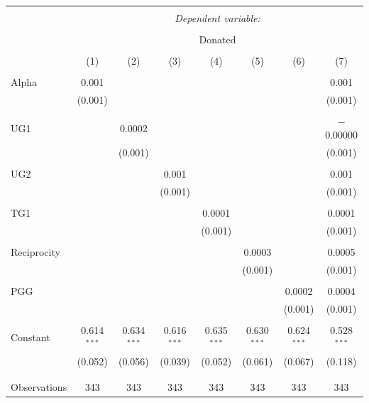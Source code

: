 \documentclass[12pt]{article}
\begin{document}
\begin{table}[!htbp] \centering 
  \caption{} 
  \label{} 
        \begin{adjustbox}{width=\textwidth}
\begin{tabular}{@{\extracolsep{5pt}}lccccccc} 
\\[-1.8ex]\hline 
\hline \\[-1.8ex] 
 & \multicolumn{7}{c}{\textit{Dependent variable:}} \\ 
\cline{2-8} 
\\[-1.8ex] & \multicolumn{7}{c}{Donated} \\ 
\\[-1.8ex] & (1) & (2) & (3) & (4) & (5) & (6) & (7)\\ 
\hline \\[-1.8ex] 
 Alpha & 0.001 &  &  &  &  &  & 0.001 \\ 
  & (0.001) &  &  &  &  &  & (0.001) \\ 
  & & & & & & & \\ 
 UG1 &  & 0.0002 &  &  &  &  & $-$0.00000 \\ 
  &  & (0.001) &  &  &  &  & (0.001) \\ 
  & & & & & & & \\ 
 UG2 &  &  & 0.001 &  &  &  & 0.001 \\ 
  &  &  & (0.001) &  &  &  & (0.001) \\ 
  & & & & & & & \\ 
 TG1 &  &  &  & 0.0001 &  &  & 0.0001 \\ 
  &  &  &  & (0.001) &  &  & (0.001) \\ 
  & & & & & & & \\ 
 Reciprocity &  &  &  &  & 0.0003 &  & 0.0005 \\ 
  &  &  &  &  & (0.001) &  & (0.001) \\ 
  & & & & & & & \\ 
 PGG &  &  &  &  &  & 0.0002 & 0.0004 \\ 
  &  &  &  &  &  & (0.001) & (0.001) \\ 
  & & & & & & & \\ 
 Constant & 0.614$^{***}$ & 0.634$^{***}$ & 0.616$^{***}$ & 0.635$^{***}$ & 0.630$^{***}$ & 0.624$^{***}$ & 0.528$^{***}$ \\ 
  & (0.052) & (0.056) & (0.039) & (0.052) & (0.061) & (0.067) & (0.118) \\ 
  & & & & & & & \\ 
\hline \\[-1.8ex] 
Observations & 343 & 343 & 343 & 343 & 343 & 343 & 343 \\ 

\end{tabular}
\end{adjustbox}
\end{table}
\end{document}
